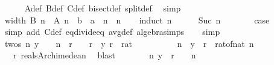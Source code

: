 \begin{isabellebody}
\ \ \ \ \isamarkupfalse%
\ A{\isacharunderscore}{\kern0pt}def\ B{\isacharunderscore}{\kern0pt}def\ C{\isacharunderscore}{\kern0pt}def\ bisect{\isacharunderscore}{\kern0pt}def\ split{\isacharunderscore}{\kern0pt}def\ \isamarkupfalse%
\ simp\isanewline
\isanewline
\ \ \isamarkupfalse%
\ width{\isacharcolon}{\kern0pt}\ {\isachardoublequoteopen}B\ n\ {\isacharminus}{\kern0pt}\ A\ n\ {\isacharequal}{\kern0pt}\ {\isacharparenleft}{\kern0pt}b\ {\isacharminus}{\kern0pt}\ a{\isacharparenright}{\kern0pt}\ {\isacharslash}{\kern0pt}\ {}{\isacharcircum}{\kern0pt}n{\isachardoublequoteclose}\ \ n\isanewline
\ \ \isamarkupfalse%
\ {\isacharparenleft}{\kern0pt}induct\ n{\isacharparenright}{\kern0pt}\isanewline
\ \ \ \ \isamarkupfalse%
\ {\isacharparenleft}{\kern0pt}Suc\ n{\isacharparenright}{\kern0pt}\isanewline
\ \ \ \ \isamarkupfalse%
\ \isamarkupfalse%
\ {\isacharquery}{\kern0pt}case\isanewline
\ \ \ \ \ \ \isamarkupfalse%
\ {\isacharparenleft}{\kern0pt}simp\ add{\isacharcolon}{\kern0pt}\ C{\isacharunderscore}{\kern0pt}def\ eq{\isacharunderscore}{\kern0pt}divide{\isacharunderscore}{\kern0pt}eq\ avg{\isacharunderscore}{\kern0pt}def\ algebra{\isacharunderscore}{\kern0pt}simps{\isacharparenright}{\kern0pt}\isanewline
\ \ \isamarkupfalse%
\ simp\isanewline
\ \ \isamarkupfalse%
\ twos{\isacharcolon}{\kern0pt}\ {\isachardoublequoteopen}{\isasymexists}n{\isachardot}{\kern0pt}\ y\ {\isacharslash}{\kern0pt}\ {}\ {\isacharcircum}{\kern0pt}\ n\ {\isacharless}{\kern0pt}\ r{\isachardoublequoteclose}\ \ {\isachardoublequoteopen}{}\ {\isacharless}{\kern0pt}\ r{\isachardoublequoteclose}\ \ y\ r\ {\isacharcolon}{\kern0pt}{\isacharcolon}{\kern0pt}\ rat\isanewline
\ \ \isamarkupfalse%
\ {\isacharminus}{\kern0pt}\isanewline
\ \ \ \ \isamarkupfalse%
\ n\ \ {\isachardoublequoteopen}y\ {\isacharslash}{\kern0pt}\ r\ {\isacharless}{\kern0pt}\ rat{\isacharunderscore}{\kern0pt}of{\isacharunderscore}{\kern0pt}nat\ n{\isachardoublequoteclose}\isanewline
\ \ \ \ \ \ \isamarkupfalse%
\ {\isacartoucheopen}{}\ {\isacharless}{\kern0pt}\ r{\isacartoucheclose}\ reals{\isacharunderscore}{\kern0pt}Archimedean{}\ \isamarkupfalse%
\ blast\isanewline
\ \ \ \ \isamarkupfalse%
\ \isamarkupfalse%
\ {\isachardoublequoteopen}{\isasymexists}n{\isachardot}{\kern0pt}\ y\ {\isacharless}{\kern0pt}\ r\ {\isacharasterisk}{\kern0pt}\ {}\ {\isacharcircum}{\kern0pt}\ n{\isachardoublequoteclose}\isanewline

\end{isabellebody}
